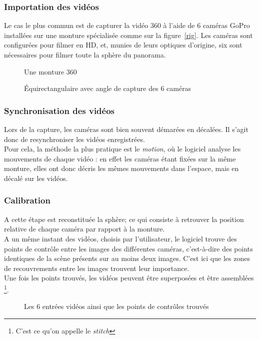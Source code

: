 \subsubsection{Importation des vidéos}
Le cas le plus commun est de capturer la vidéo 360 à l'aide de 6 caméras GoPro 
installées sur une monture spécialisée comme sur la figure~\ref{rig}. 
Les caméras sont configurées pour filmer en HD, et, munies de leurs optiques 
d'origine, six sont nécessaires pour filmer toute la sphère du panorama.
\begin{figure}
  \centering
  \begin{minipage}{0.4\textwidth}
    \centering
    \caption{Une monture 360}
    \label{rig}
  \end{minipage}%
  \begin{minipage}{0.6\textwidth}
    \centering
    \caption{Équirectangulaire avec angle de capture des 6 caméras} 
    \label{equirectangulaire-inputs}
  \end{minipage}
\end{figure}

\subsubsection{Synchronisation des vidéos}
Lors de la capture, les caméras sont bien souvent démarées en décalées. Il s'agit
donc de resynchroniser les vidéos enregistrées.\\
Pour cela, la méthode la plus pratique est le \textit{motion},
où le logiciel analyse les mouvements de chaque vidéo : en effet les caméras étant fixées
sur la même monture, elles ont donc décris les mêmes mouvements dans l'espace, mais 
en décalé sur les vidéos.

\subsubsection{Calibration}
A cette étape est reconstituée la sphère; ce qui consiste à retrouver la 
position relative de chaque caméra par rapport à la monture.\\
A un même instant des vidéos, choisis par l'utilisateur, le logiciel trouve des
points de contrôle entre les images des différentes caméras, c'est-à-dire des
points identiques de la scène présents sur au moins deux images. C'est ici que les 
zones de recouvrements entre les images trouvent leur importance.\\
Une fois les points trouvés, les vidéos peuvent être superposées et être assemblées
\footnote{C'est ce qu'on appelle le \textit{stitch}}.
\begin{figure}
  \centering
  \caption{Les 6 entrées vidéos ainsi que les points de contrôles trouvés} 
\end{figure}

